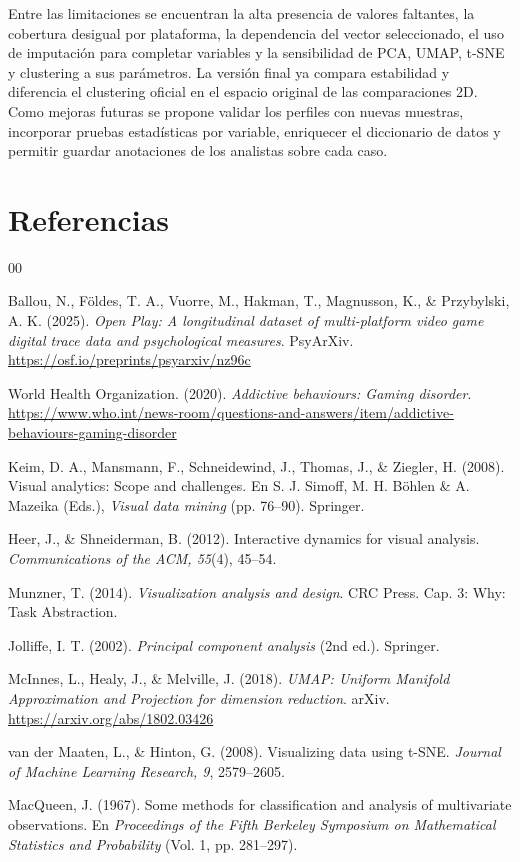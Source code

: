\documentclass[12pt,a4paper]{article}
\begin{document}
Entre las limitaciones se encuentran la alta presencia de valores faltantes, la cobertura desigual por plataforma, la dependencia del vector seleccionado, el uso de imputaci\'on para completar variables y la sensibilidad de PCA, UMAP, t-SNE y clustering a sus par\'ametros. La versi\'on final ya compara estabilidad y diferencia el clustering oficial en el espacio original de las comparaciones 2D. Como mejoras futuras se propone validar los perfiles con nuevas muestras, incorporar pruebas estad\'isticas por variable, enriquecer el diccionario de datos y permitir guardar anotaciones de los analistas sobre cada caso.

\section{Referencias}

\begin{thebibliography}{00}

Ballou, N., F\"oldes, T. A., Vuorre, M., Hakman, T., Magnusson, K., \& Przybylski, A. K. (2025). \textit{Open Play: A longitudinal dataset of multi-platform video game digital trace data and psychological measures}. PsyArXiv. \url{https://osf.io/preprints/psyarxiv/nz96c}

World Health Organization. (2020). \textit{Addictive behaviours: Gaming disorder}. \url{https://www.who.int/news-room/questions-and-answers/item/addictive-behaviours-gaming-disorder}

Keim, D. A., Mansmann, F., Schneidewind, J., Thomas, J., \& Ziegler, H. (2008). Visual analytics: Scope and challenges. En S. J. Simoff, M. H. B\"ohlen \& A. Mazeika (Eds.), \textit{Visual data mining} (pp. 76--90). Springer.

Heer, J., \& Shneiderman, B. (2012). Interactive dynamics for visual analysis. \textit{Communications of the ACM, 55}(4), 45--54.

Munzner, T. (2014). \textit{Visualization analysis and design}. CRC Press. Cap. 3: Why: Task Abstraction.

Jolliffe, I. T. (2002). \textit{Principal component analysis} (2nd ed.). Springer.

McInnes, L., Healy, J., \& Melville, J. (2018). \textit{UMAP: Uniform Manifold Approximation and Projection for dimension reduction}. arXiv. \url{https://arxiv.org/abs/1802.03426}

van der Maaten, L., \& Hinton, G. (2008). Visualizing data using t-SNE. \textit{Journal of Machine Learning Research, 9}, 2579--2605.

MacQueen, J. (1967). Some methods for classification and analysis of multivariate observations. En \textit{Proceedings of the Fifth Berkeley Symposium on Mathematical Statistics and Probability} (Vol. 1, pp. 281--297).

\end{thebibliography}
\end{document}
